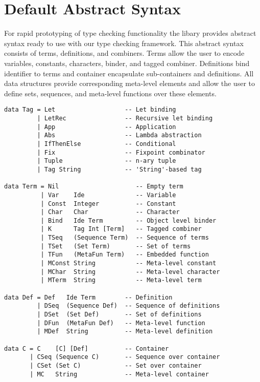 \renewcommand{\thesection}{Appendix \Alph{section}:}
\setcounter{section}{0}

\section{Default Abstract Syntax}

For rapid prototyping of type checking functionality the libary
provides abstract syntax ready to use with our type checking
framework. This abstract syntax consists of terms, definitions, and
combiners. Terms allow the user to encode variables, constants,
characters, binder, and tagged combiner. Definitions bind identifier
to terms and container encapsulate sub-containers and definitions.
All data structures provide corresponding meta-level elements and
allow the user to define sets, sequences, and meta-level functions
over these elements.

\bigskip
\begin{lstlisting}
data Tag = Let                   -- Let binding
         | LetRec                -- Recursive let binding
         | App                   -- Application
         | Abs                   -- Lambda abstraction
         | IfThenElse            -- Conditional
         | Fix                   -- Fixpoint combinator
         | Tuple                 -- n-ary tuple
         | Tag String            -- 'String'-based tag

data Term = Nil                     -- Empty term
          | Var    Ide              -- Variable
          | Const  Integer          -- Constant
          | Char   Char             -- Character
          | Bind   Ide Term         -- Object level binder
          | K      Tag Int [Term]   -- Tagged combiner
          | TSeq   (Sequence Term)  -- Sequence of terms
          | TSet   (Set Term)       -- Set of terms
          | TFun   (MetaFun Term)   -- Embedded function
          | MConst String           -- Meta-level constant
          | MChar  String           -- Meta-level character
          | MTerm  String           -- Meta-level term

data Def = Def   Ide Term        -- Definition
         | DSeq  (Sequence Def)  -- Sequence of definitions
         | DSet  (Set Def)       -- Set of definitions
         | DFun  (MetaFun Def)   -- Meta-level function
         | MDef  String          -- Meta-level definition

data C = C    [C] [Def]          -- Container
       | CSeq (Sequence C)       -- Sequence over container
       | CSet (Set C)            -- Set over container
       | MC   String             -- Meta-level container
\end{lstlisting}